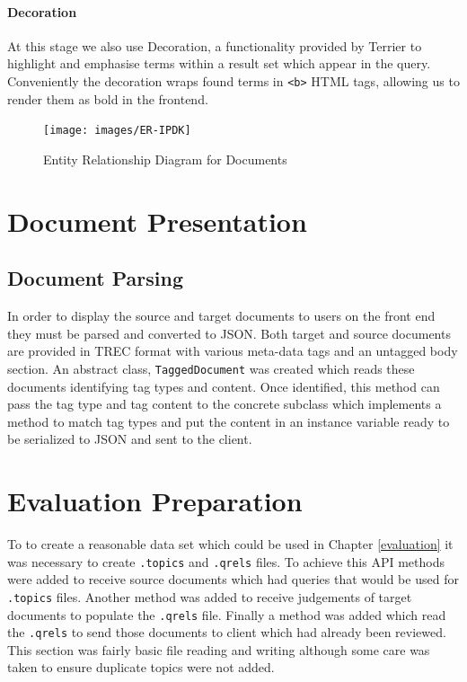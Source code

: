 \documentclass{l4proj}
\newcommand{\code}[1]{\texttt{#1}}
\begin{document}
\paragraph{Decoration} \label{server_decoration}
At this stage we also use Decoration, a functionality provided by Terrier to highlight and emphasise terms within a result set which appear in the query. Conveniently the decoration wraps found terms in \code{<b>} HTML tags, allowing us to render them as bold in the frontend.

\begin{figure}[H]
\centering
\texttt{[image: images/ER-IPDK]}
\caption{Entity Relationship Diagram for Documents}
\label{er}
\end{figure}

\section{Document Presentation}
\subsection{Document Parsing} \label{docparse}
In order to display the source and target documents to users on the front end they must be parsed and converted to JSON.
Both target and source documents are provided in TREC format with various meta-data tags and an untagged body section.
An abstract class, \code{TaggedDocument} was created which reads these documents identifying tag types and content. Once identified, this method can pass the tag type and tag content to the concrete subclass which implements a method to match tag types and put the content in an instance variable ready to be serialized to JSON and sent to the client.

\section{Evaluation Preparation}
To to create a reasonable data set which could be used in Chapter \ref{evaluation} it was necessary to create \code{.topics} and \code{.qrels} files.
To achieve this API methods were added to receive source documents which had queries that would be used for \code{.topics} files. Another method was added to receive judgements of target documents to populate the \code{.qrels} file. Finally a method was added which read the \code{.qrels} to send those documents to client which had already been reviewed.
This section was fairly basic file reading and writing although some care was taken to ensure duplicate topics were not added.
\end{document}
